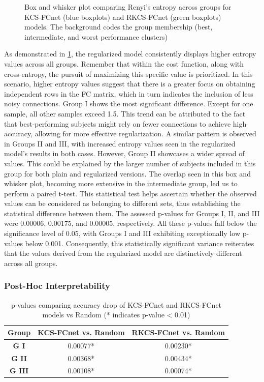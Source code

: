\begin{figure}[!h]
  \centering
  \resizebox{\linewidth}{!}{}
  \caption{Box and whisker plot comparing Renyi's entropy across groups for KCS-FCnet  (blue boxplots) and RKCS-FCnet (green boxplots) models. The background codes the group membership (best, intermediate, and worst performance
clusters)}
  \label{fig:renyi_obj3}
\end{figure}


As demonstrated in \cref{fig:renyi_obj3}, the regularized model consistently displays higher entropy values across all groups. Remember that within the cost function, along with cross-entropy, the pursuit of maximizing this specific value is prioritized. In this scenario, higher entropy values suggest that there is a greater focus on obtaining independent rows in the FC matrix, which in turn indicates the inclusion of less noisy connections. Group I shows the most significant difference. Except for one sample, all other samples exceed 1.5. This trend can be attributed to the fact that best-performing subjects might rely on fewer connections to achieve high accuracy, allowing for more effective regularization. A similar pattern is observed in Groups II and III, with increased entropy values seen in the regularized model's results in both cases. However, Group II showcases a wider spread of values. This could be explained by the larger number of subjects included in this group for both plain and regularized versions. The overlap seen in this box and whisker plot, becoming more extensive in the intermediate group, led us to perform a paired t-test. This statistical test helps ascertain whether the observed values can be considered as belonging to different sets, thus establishing the statistical difference between them. The assessed p-values for Groups I, II, and III were 0.00006, 0.00175, and 0.00005, respectively. All these p-values fall below the significance level of 0.05, with Groups I and III exhibiting exceptionally low p-values below 0.001. Consequently, this statistically significant variance reiterates that the values derived from the regularized model are distinctively different across all groups.

\subsubsection{Post-Hoc Interpretability}

\begin{table}[h!]
\centering
\caption{p-values comparing accuracy drop of KCS-FCnet and RKCS-FCnet models vs Random (* indicates p-value < 0.01)}\label{table:p_values}
\begin{tabular}{|c|c|c|}
\hline
\textbf{Group} & \textbf{KCS-FCnet vs. Random} & \textbf{RKCS-FCnet vs. Random} \\ \hline
\textbf{G I} & 0.00077* & 0.00230* \\
\textbf{G II} & 0.00368* & 0.00434* \\
\textbf{G III} & 0.00108* & 0.00074* \\ \hline
\end{tabular}
\end{table}

